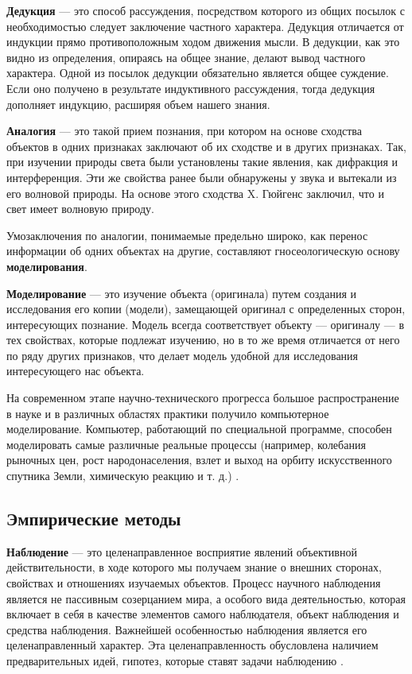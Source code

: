 \textbf{Дедукция} --- это способ рассуждения, посредством которого из общих посылок с необходимостью следует заключение частного характера. Дедукция отличается от индукции прямо противоположным ходом движения мысли. В дедукции, как это видно из определения, опираясь на общее знание, делают вывод частного характера. Одной из посылок дедукции обязательно является общее суждение. Если оно получено в результате индуктивного рассуждения, тогда дедукция дополняет индукцию, расширяя объем нашего знания.

\textbf{Аналогия} --- это такой прием познания, при котором на основе сходства объектов в одних признаках заключают об их сходстве и в других признаках. Так, при изучении природы света были установлены такие явления, как дифракция и интерференция. Эти же свойства ранее были обнаружены у звука и вытекали из его волновой природы. На основе этого сходства X. Гюйгенс заключил, что и свет имеет волновую природу.

Умозаключения по аналогии, понимаемые предельно широко, как перенос информации об одних объектах на другие, составляют гносеологическую основу \textbf{моделирования}.

\textbf{Моделирование} --- это изучение объекта (оригинала) путем создания и исследования его копии (модели), замещающей оригинал с определенных сторон, интересующих познание. Модель всегда соответствует объекту --- оригиналу --- в тех свойствах, которые подлежат изучению, но в то же время отличается от него по ряду других признаков, что делает модель удобной для исследования интересующего нас объекта.

На современном этапе научно-технического прогресса большое распространение в науке и в различных областях практики получило компьютерное моделирование. Компьютер, работающий по специальной программе, способен моделировать самые различные реальные процессы (например, колебания рыночных цен, рост народонаселения, взлет и выход на орбиту искусственного спутника Земли, химическую реакцию и т. д.) \cite{mir:philosophy}.

\subsection{Эмпирические методы}

\textbf{Наблюдение} --- это целенаправленное восприятие явлений объективной действительности, в ходе которого мы получаем знание о внешних сторонах, свойствах и отношениях изучаемых объектов. Процесс научного наблюдения является не пассивным созерцанием мира, а особого вида деятельностью, которая включает в себя в качестве элементов самого наблюдателя, объект наблюдения и средства наблюдения. Важнейшей особенностью наблюдения является его целенаправленный характер. Эта целенаправленность обусловлена наличием предварительных идей, гипотез, которые ставят задачи наблюдению \cite{mir:philosophy}.

